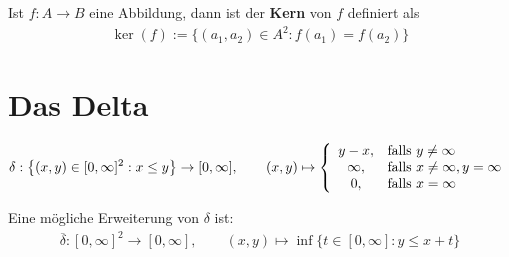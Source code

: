 \begin{definition}
	Ist $f:A\to B$ eine Abbildung, dann ist der \textbf{Kern} von $f$ definiert als
	\begin{align*}
		\ker(f):=\big\lbrace(a_1,a_2)\in A^2:f(a_1)=f(a_2)\big\rbrace
	\end{align*}
\end{definition}

\section{Das Delta}

\begin{definition}
	\begin{align*}
		\delta:\big\lbrace(x,y)\in[0,\infty]^2:x\leq y\big\rbrace\to[0,\infty],\qquad (x,y)\mapsto\left\lbrace\begin{array}{cl}
			y-x,&\text{falls } y\neq\infty\\
			\infty, &\text{falls } x\neq\infty,y=\infty\\
			0, &\text{falls } x=\infty
		\end{array}\right.
	\end{align*}
\end{definition}

\begin{lemma}
	Eine mögliche Erweiterung von $\delta$ ist:
	\begin{align*}
		\overline{\delta}:[0,\infty]^2\to[0,\infty],\qquad
		(x,y)\mapsto\inf\big\lbrace t\in[0,\infty]:y\leq x+t\big\rbrace
	\end{align*}
\end{lemma}

